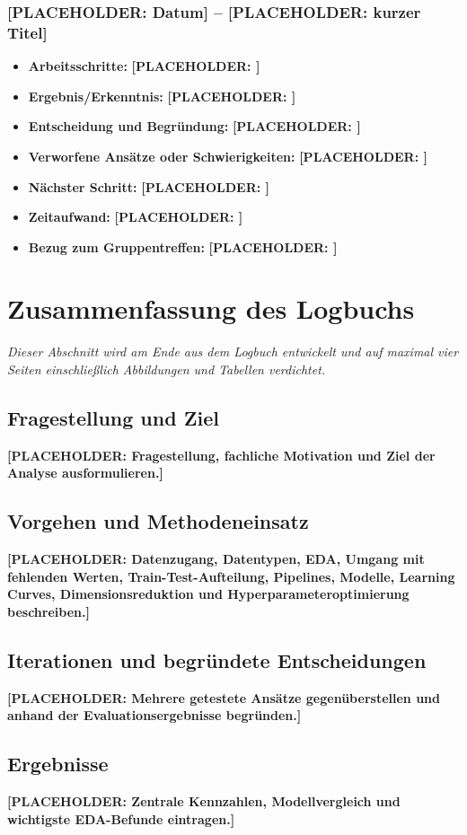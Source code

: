 \documentclass[11pt,a4paper]{article}
\newcommand{\placeholder}[1]{\textcolor{ADAgold}{\textbf{[PLACEHOLDER: #1]}}}
\newcommand{\logentry}[2]{\subsubsection*{#1 – #2}}
\begin{document}
\logentry{\placeholder{Datum}}{\placeholder{kurzer Titel}}
\begin{itemize}
  \item \textbf{Arbeitsschritte:} \placeholder{}
  \item \textbf{Ergebnis/Erkenntnis:} \placeholder{}
  \item \textbf{Entscheidung und Begründung:} \placeholder{}
  \item \textbf{Verworfene Ansätze oder Schwierigkeiten:} \placeholder{}
  \item \textbf{Nächster Schritt:} \placeholder{}
  \item \textbf{Zeitaufwand:} \placeholder{}
  \item \textbf{Bezug zum Gruppentreffen:} \placeholder{}
\end{itemize}

\section{Zusammenfassung des Logbuchs}
\textit{Dieser Abschnitt wird am Ende aus dem Logbuch entwickelt und auf maximal vier
Seiten einschließlich Abbildungen und Tabellen verdichtet.}

\subsection{Fragestellung und Ziel}
\placeholder{Fragestellung, fachliche Motivation und Ziel der Analyse ausformulieren.}

\subsection{Vorgehen und Methodeneinsatz}
\placeholder{Datenzugang, Datentypen, EDA, Umgang mit fehlenden Werten, Train-Test-Aufteilung,
Pipelines, Modelle, Learning Curves, Dimensionsreduktion und Hyperparameteroptimierung
beschreiben.}

\subsection{Iterationen und begründete Entscheidungen}
\placeholder{Mehrere getestete Ansätze gegenüberstellen und anhand der Evaluationsergebnisse
begründen.}

\subsection{Ergebnisse}
\placeholder{Zentrale Kennzahlen, Modellvergleich und wichtigste EDA-Befunde eintragen.}
\end{document}
